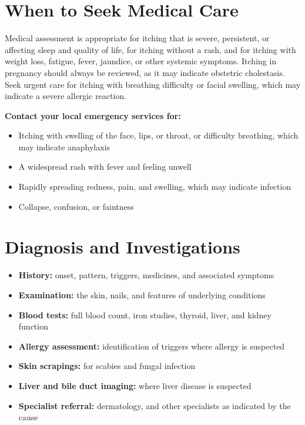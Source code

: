 \section*{When to Seek Medical Care}
Medical assessment is appropriate for itching that is severe, persistent, or affecting sleep and quality of life, for itching without a rash, and for itching with weight loss, fatigue, fever, jaundice, or other systemic symptoms. Itching in pregnancy should always be reviewed, as it may indicate obstetric cholestasis. Seek urgent care for itching with breathing difficulty or facial swelling, which may indicate a severe allergic reaction.

\textbf{Contact your local emergency services for:}
\begin{itemize}
    \item Itching with swelling of the face, lips, or throat, or difficulty breathing, which may indicate anaphylaxis
    \item A widespread rash with fever and feeling unwell
    \item Rapidly spreading redness, pain, and swelling, which may indicate infection
    \item Collapse, confusion, or faintness
\end{itemize}

\section*{Diagnosis and Investigations}
\begin{itemize}
    \item \textbf{History:} onset, pattern, triggers, medicines, and associated symptoms
    \item \textbf{Examination:} the skin, nails, and features of underlying conditions
    \item \textbf{Blood tests:} full blood count, iron studies, thyroid, liver, and kidney function
    \item \textbf{Allergy assessment:} identification of triggers where allergy is suspected
    \item \textbf{Skin scrapings:} for scabies and fungal infection
    \item \textbf{Liver and bile duct imaging:} where liver disease is suspected
    \item \textbf{Specialist referral:} dermatology, and other specialists as indicated by the cause
\end{itemize}

